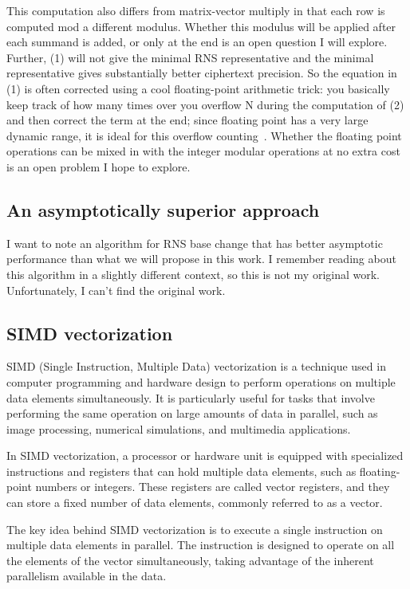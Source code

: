 This computation also differs from matrix-vector multiply in that each row is
computed mod a different modulus.
Whether this modulus will be applied after each summand is added, or only at
the end is an open question I will explore.
Further, (1) will not give the minimal RNS representative and the minimal
representative gives substantially better ciphertext precision\cite{bajard2017full}.
So the equation in (1) is often corrected using a cool floating-point
arithmetic trick: you basically keep track of how many times over you overflow
N during the computation of (2) and then correct the term at the end; since
floating point has a very large dynamic range, it is ideal for this overflow
counting~\cite{lattigo-github}.
Whether the floating point operations can be mixed in with the integer modular
operations at no extra cost is an open problem I hope to explore.


\subsection{An asymptotically superior approach}

\figAsymptotic

I want to note an algorithm for RNS base change that has better asymptotic
performance than what we will propose in this work.
I remember reading about this algorithm in a slightly different context, so
this is not my original work.
Unfortunately, I can't find the original work.

\subsection{SIMD vectorization}

SIMD (Single Instruction, Multiple Data) vectorization is a technique used in
computer programming and hardware design to perform operations on multiple data
elements simultaneously. It is particularly useful for tasks that involve
performing the same operation on large amounts of data in parallel, such as
image processing, numerical simulations, and multimedia applications.

In SIMD vectorization, a processor or hardware unit is equipped with
specialized instructions and registers that can hold multiple data elements,
such as floating-point numbers or integers. These registers are called vector
registers, and they can store a fixed number of data elements, commonly
referred to as a vector.

The key idea behind SIMD vectorization is to execute a single instruction on
multiple data elements in parallel. The instruction is designed to operate on
all the elements of the vector simultaneously, taking advantage of the inherent
parallelism available in the data.

